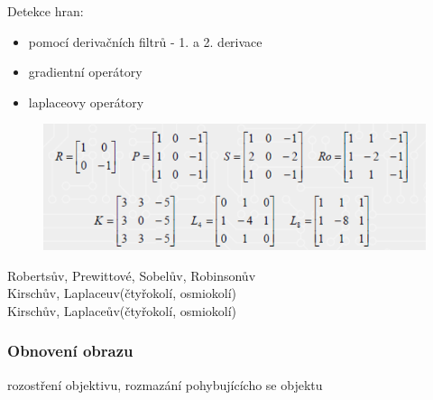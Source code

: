 Detekce hran:
\begin{itemize}
    \item pomocí derivačních filtrů - 1. a 2. derivace
    \item gradientní operátory
    \item laplaceovy operátory
\end{itemize}
\begin{figure}[H]
    \includegraphics[scale = 0.7]{images/hrany.png}
\end{figure}
Robertsův, Prewittové, Sobelův, Robinsonův\\
Kirschův, Laplaceuv(čtyřokolí, osmiokolí)\\
Kirschův, Laplaceův(čtyřokolí, osmiokolí)\\

\subsubsection{Obnovení obrazu}
rozostření objektivu, rozmazání pohybujícícho se objektu\\

